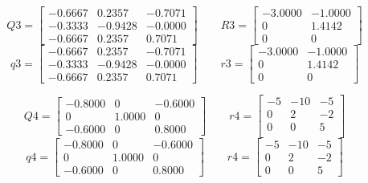 \documentclass[UTF8]{ctexart}
\begin{document}
$$Q3=\begin{bmatrix}

   -0.6667   & 0.2357 &  -0.7071\\
-0.3333 &  -0.9428  & -0.0000\\
-0.6667   & 0.2357 &   0.7071

\end{bmatrix}\qquad
R3= \begin{bmatrix}
-3.0000   &-1.0000\\
0   & 1.4142\\
0    &     0
\end{bmatrix} $$
$$q3 =\begin{bmatrix}
   -0.6667   & 0.2357 &  -0.7071\\
-0.3333 &  -0.9428  & -0.0000\\
-0.6667   & 0.2357 &   0.7071

\end{bmatrix}\qquad
r3=\begin{bmatrix}	
-3.0000   &-1.0000\\
0   & 1.4142\\
0    &     0
\end{bmatrix}$$    

$$Q4=\begin{bmatrix}

-0.8000     &    0  & -0.6000\\
0   & 1.0000    &     0\\
-0.6000     &    0  &  0.8000

\end{bmatrix}\qquad
r4= \begin{bmatrix}
-5  &  -10   & -5\\
0   &  2  &  -2\\
0   &  0  &   5\\

\end{bmatrix} $$
$$q4 =\begin{bmatrix}
-0.8000      &   0 &  -0.6000\\
0  &  1.0000     &    0\\
-0.6000   &      0 &   0.8000	
\end{bmatrix}\qquad
r4=\begin{bmatrix}	
-5  & -10   & -5\\
0   &  2   & -2\\
0   &  0  &   5
\end{bmatrix}$$    
\end{document}
